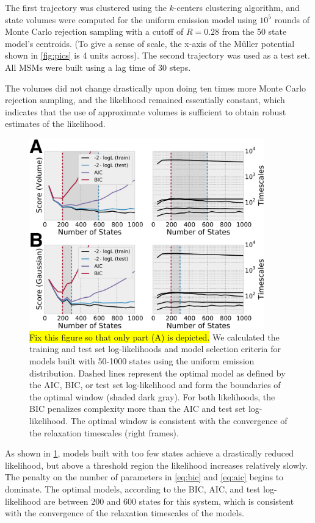 \documentclass[journal=jpcbfk, layout=traditional, manuscript=article]{achemso}
\begin{document}
The first trajectory was clustered using the $k$-centers clustering algorithm, and state volumes were computed for the uniform emission model using $10^5$ rounds of Monte Carlo rejection sampling with a cutoff of $R=0.28$ from the 50 state model's centroids. (To give a sense of scale, the x-axis of the M\"{u}ller potential shown in \cref{fig:pics} is 4 units across). The second trajectory was used as a test set. All MSMs were built using a lag time of 30 steps.

The volumes did not change drastically upon doing ten times more Monte Carlo rejection sampling, and the likelihood remained essentially constant, which indicates that the use of approximate volumes is sufficient to obtain robust estimates of the likelihood. 

\begin{figure}[h]
\centering
\includegraphics[width=4in]{figs_final/mull_likes.png}
\caption{\hl{Fix this figure so that only part (A) is depicted.} We calculated the training and test set log-likelihoods and model selection criteria for models built with 50-1000 states using the uniform emission distribution. Dashed lines represent the optimal model as defined by the AIC, BIC, or test set log-likelihood and form the boundaries of the optimal window (shaded dark gray). For both likelihoods, the BIC penalizes complexity more than the AIC and test set log-likelihood. The optimal window is consistent with the convergence of the relaxation timescales (right frames).}
\label{fig:mullerlike}
\end{figure}

As shown in \cref{fig:mullerlike}, models built with too few states achieve a drastically reduced likelihood, but above a threshold region the likelihood increases relatively slowly. The penalty on the number of parameters in \cref{eq:bic} and \cref{eq:aic} begins to dominate. The optimal models, according to the BIC, AIC, and test log-likelihood are between 200 and 600 states for this system, which is consistent with the convergence of the relaxation timescales of the models. 
\end{document}
